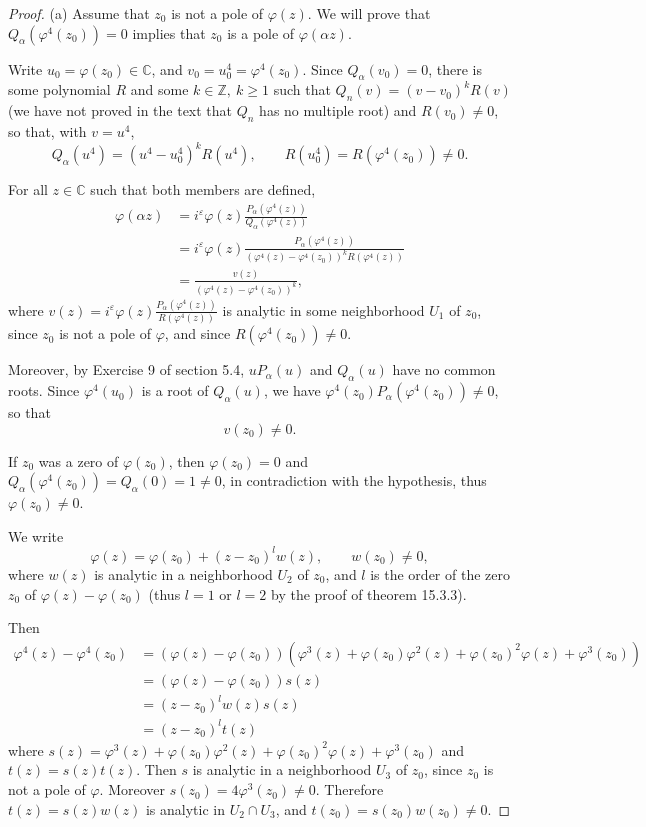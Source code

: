 \documentclass[11pt,a4paper]{article}
\newcommand{\Z}{\mathbb{Z}}
\newcommand{\C}{\mathbb{C}}
\begin{document}
\begin{proof} 
\item[(a)] Assume  that $z_0$ is not a pole of $\varphi(z)$. We will prove that $Q_\alpha(\varphi^4(z_0)) = 0$ implies that $z_0$ is a pole of $\varphi(\alpha z)$. 

Write $u_0 = \varphi(z_0) \in \C$, and $v_0 = u_0^4 = \varphi^4(z_0)$. Since $Q_\alpha(v_0) = 0$, there is some polynomial $R$ and some $k \in \Z,\ k\geq 1$ such that $Q_n(v) = (v-v_0)^k R(v)$ (we have not proved in the text that $Q_n$ has no multiple root) and $R(v_0) \ne 0$, so that, with $v = u^4$,
$$Q_\alpha(u^4) = (u^4 - u_0^4)^k R(u^4), \qquad R(u_0^4) = R(\varphi^4(z_0)) \ne 0.$$

For all $z \in \C$ such that both members are defined,
\begin{align*}
\varphi(\alpha z) &= i^\varepsilon \varphi(z) \frac{P_\alpha(\varphi^4(z))}{Q_\alpha(\varphi^4(z))}\\
&= i^\varepsilon \varphi(z) \frac{P_\alpha(\varphi^4(z))}{(\varphi^4(z) - \varphi^4(z_0))^k R(\varphi^4(z))}\\
&= \frac{v(z)}{(\varphi^4(z) - \varphi^4(z_0))^k},
\end{align*}
where $v(z) = i^\varepsilon \varphi(z) \frac{P_\alpha(\varphi^4(z))}{R(\varphi^4(z))}$ is analytic in some neighborhood $U_1$ of $z_0$, since $z_0$ is not a pole of $\varphi$, and since $R(\varphi^4(z_0)) \ne 0$.

Moreover, by Exercise 9 of section 5.4, $u P_\alpha(u)$ and $Q_\alpha(u)$ have no common roots. Since $\varphi^4(u_0)$ is a root of $Q_\alpha(u)$, we have $\varphi^4(z_0) P_\alpha(\varphi^4(z_0)) \ne 0$, so that 
$$v(z_0) \ne 0.$$

\bigskip

 If $z_0$ was a zero of $\varphi(z_0)$, then $\varphi(z_0) = 0$ and $Q_\alpha(\varphi^4(z_0)) = Q_\alpha(0) = 1 \ne 0$, in contradiction with the hypothesis, thus $\varphi(z_0) \ne 0$.

We write
$$\varphi(z) = \varphi(z_0) + (z-z_0)^l w(z), \qquad w(z_0) \ne 0,$$
where $w(z)$ is analytic in a neighborhood $U_2$ of $z_0$, and $l$ is the order of the zero $z_0$ of $\varphi(z) - \varphi(z_0)$ (thus $l = 1$ or $l = 2$ by the proof of theorem 15.3.3).

Then 
\begin{align*}
\varphi^4(z) - \varphi^4(z_0) &= (\varphi(z)- \varphi(z_0)) (\varphi^3(z) + \varphi(z_0) \varphi^2(z) + \varphi(z_0)^2 \varphi(z) + \varphi^3(z_0))\\
&=(\varphi(z)- \varphi(z_0)) s(z)\\
&= (z-z_0)^l w(z) s(z)\\
&= (z-z_0)^l t(z)
\end{align*}
where $s(z) = \varphi^3(z) + \varphi(z_0) \varphi^2(z) + \varphi(z_0)^2 \varphi(z) + \varphi^3(z_0)$ and $t(z) = s(z) t(z)$. Then $s$ is analytic in a neighborhood $U_3$ of $z_0$, since $z_0$ is not a pole of $\varphi$.  Moreover $s(z_0) = 4 \varphi^3(z_0) \ne 0$. Therefore $t(z) = s(z) w(z)$ is analytic in $U_2 \cap U_3$, and $t(z_0) =s(z_0) w(z_0) \ne 0$.


\end{proof}
\end{document}
